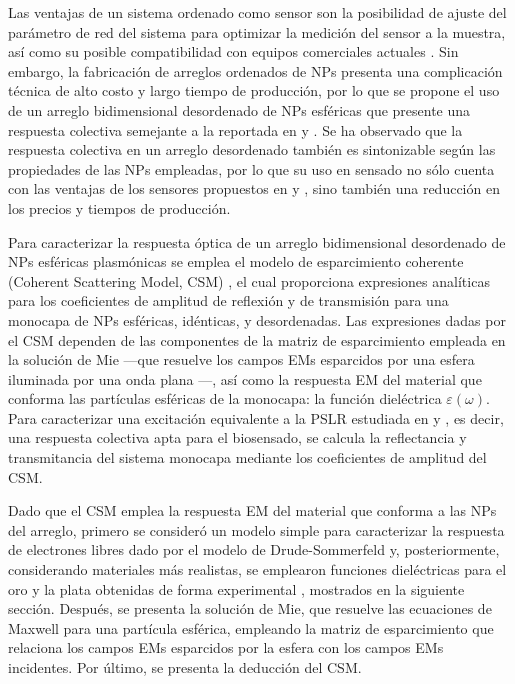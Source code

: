 Las ventajas de un sistema ordenado como sensor son la posibilidad de ajuste del parámetro de red del sistema para optimizar la medición del sensor a la muestra, así como su posible compatibilidad con equipos comerciales actuales \cite{kabashin2009plasmonic}.  Sin embargo, la fabricaci\'on de arreglos ordenados de NPs presenta una complicaci\'on t\'ecnica de alto costo y largo tiempo de producción, por lo que se propone el uso de un arreglo bidimensional desordenado de NPs esféricas que presente una respuesta colectiva semejante a la reportada en \cite{kabashin2009plasmonic} y \cite{danilov2018ultra}.  Se ha observado que la respuesta colectiva en un arreglo desordenado también es sintonizable según las propiedades de las NPs empleadas, por lo que su uso en sensado no sólo cuenta con las ventajas de los sensores propuestos en \cite{kabashin2009plasmonic} y \cite{danilov2018ultra}, sino también una reducción en los precios y tiempos de producción. 


Para  caracterizar la respuesta óptica de un arreglo bidimensional desordenado de NPs esféricas plasmónicas se emplea el modelo de esparcimiento coherente (Coherent Scattering Model, CSM) \cite{reyes2018analytical}, el cual proporciona expresiones analíticas para los coeficientes de amplitud de reflexión y de transmisión para una monocapa de NPs esféricas, idénticas, y desordenadas.  Las expresiones  dadas por el CSM dependen de las componentes de la matriz de esparcimiento empleada en la solución de Mie ---que resuelve los campos EMs esparcidos por una esfera iluminada por una onda plana \cite{bohren1998absorption}---, así como la respuesta EM del material que conforma las partículas esféricas de la monocapa: la función dieléctrica $\varepsilon(\omega)$.  Para caracterizar una excitación equivalente a la PSLR estudiada en \cite{kabashin2009plasmonic} y \cite{danilov2018ultra}, es decir, una respuesta colectiva apta para el biosensado, se calcula la reflectancia y transmitancia del sistema monocapa mediante los coeficientes de amplitud del CSM. 
 
Dado que el CSM emplea la respuesta EM del material que conforma a las NPs del arreglo, primero se consideró un modelo simple para caracterizar la respuesta de electrones libres dado por el modelo de Drude-Sommerfeld \cite{novotny2006principles} y, posteriormente, considerando materiales más  realistas, se emplearon funciones dieléctricas para el oro y la plata obtenidas de forma experimental \cite{johnson1972constants}, mostrados en la siguiente sección.  Después, se presenta la solución de Mie, que resuelve las ecuaciones de Maxwell para una partícula esférica, empleando la matriz de esparcimiento que relaciona los campos EMs esparcidos por la esfera con los campos EMs incidentes.  Por último, se presenta la deducción del CSM. 

